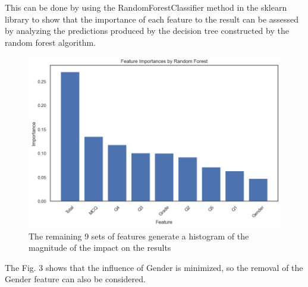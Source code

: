 \documentclass[twocolumn]{IEEEtran}
\begin{document}
This can be done by using the RandomForestClassifier method in the sklearn library to show that the importance of each feature to the result can be assessed by analyzing the predictions produced by the decision tree constructed by the random forest algorithm. 
\begin{figure}[H]
    \centering %
    \includegraphics[scale=0.3]{./img/random_forest.png}
    \caption{The remaining 9 sets of features generate a histogram of the magnitude of the impact on the results}
\end{figure}
The Fig. 3 shows that the influence of Gender is minimized, so the removal of the Gender feature can also be considered.

\end{document}
